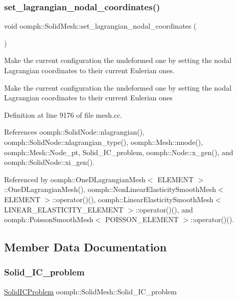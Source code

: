 \subsubsection{\texorpdfstring{set\+\_\+lagrangian\+\_\+nodal\+\_\+coordinates()}{set\_lagrangian\_nodal\_coordinates()}}
{\footnotesize\ttfamily void oomph\+::\+Solid\+Mesh\+::set\+\_\+lagrangian\+\_\+nodal\+\_\+coordinates (\begin{DoxyParamCaption}{ }\end{DoxyParamCaption})}



Make the current configuration the undeformed one by setting the nodal Lagrangian coordinates to their current Eulerian ones. 

Make the current configuration the undeformed one by setting the nodal Lagrangian coordinates to their current Eulerian ones 

Definition at line 9176 of file mesh.\+cc.



References oomph\+::\+Solid\+Node\+::nlagrangian(), oomph\+::\+Solid\+Node\+::nlagrangian\+\_\+type(), oomph\+::\+Mesh\+::nnode(), oomph\+::\+Mesh\+::\+Node\+\_\+pt, Solid\+\_\+\+I\+C\+\_\+problem, oomph\+::\+Node\+::x\+\_\+gen(), and oomph\+::\+Solid\+Node\+::xi\+\_\+gen().



Referenced by oomph\+::\+One\+D\+Lagrangian\+Mesh$<$ E\+L\+E\+M\+E\+N\+T $>$\+::\+One\+D\+Lagrangian\+Mesh(), oomph\+::\+Non\+Linear\+Elasticity\+Smooth\+Mesh$<$ E\+L\+E\+M\+E\+N\+T $>$\+::operator()(), oomph\+::\+Linear\+Elasticity\+Smooth\+Mesh$<$ L\+I\+N\+E\+A\+R\+\_\+\+E\+L\+A\+S\+T\+I\+C\+I\+T\+Y\+\_\+\+E\+L\+E\+M\+E\+N\+T $>$\+::operator()(), and oomph\+::\+Poisson\+Smooth\+Mesh$<$ P\+O\+I\+S\+S\+O\+N\+\_\+\+E\+L\+E\+M\+E\+N\+T $>$\+::operator()().



\subsection{Member Data Documentation}
\mbox{\label{classoomph_1_1SolidMesh_a6ec5dbbbccfb4e5f1aa92a29905f5073}} 
\subsubsection{\texorpdfstring{Solid\+\_\+\+I\+C\+\_\+problem}{Solid\_IC\_problem}}
{\footnotesize\ttfamily \hyperlink{classoomph_1_1SolidICProblem}{Solid\+I\+C\+Problem} oomph\+::\+Solid\+Mesh\+::\+Solid\+\_\+\+I\+C\+\_\+problem\hspace{0.3cm}{\ttfamily [static]}}



